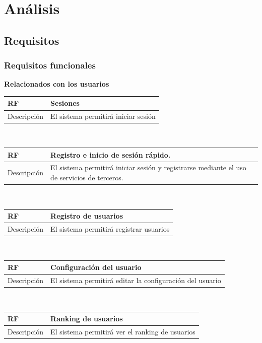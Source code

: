 \documentclass[twoside]{report}
\newcommand\addrow[2]{#1 &#2\\ }
\newcommand\addheading[2]{#1 &#2\\ \hline}
\newcommand\tabularhead{\begin{tabular}{lp{0.7\textwidth}}
\hline
}
\newenvironment{req}{\tabularhead}
{\hline\end{tabular}}
\begin{document}
\section{Análisis}
\subsection{Requisitos}

\subsubsection{Requisitos funcionales}

\textbf{Relacionados con los usuarios}\\

\begin{req}
	\addheading{\textbf{RF\arabic{functionalRequirements}}}{Sesiones}
	\addrow{Descripción}{El sistema permitirá iniciar sesión}
\end{req} \\
 
\begin{req}
	\addheading{\textbf{RF\arabic{functionalRequirements}}}{Registro e inicio de sesión rápido.}
	\addrow{Descripción}{El sistema permitirá iniciar sesión y registrarse mediante el uso de servicios de terceros.}
\end{req} \\

\begin{req}
	\addheading{\textbf{RF\arabic{functionalRequirements}}}{Registro de usuarios}
	\addrow{Descripción}{El sistema permitirá registrar usuarios}
\end{req}\\

\begin{req}
	\addheading{\textbf{RF\arabic{functionalRequirements}}}{Configuración del usuario}
	\addrow{Descripción}{El sistema permitirá editar la configuración del usuario}
\end{req}\\

\begin{req}
	\addheading{\textbf{RF\arabic{functionalRequirements}}}{Ranking de usuarios}
	\addrow{Descripción}{El sistema permitirá ver el ranking de usuarios}
\end{req}\\
\end{document}
